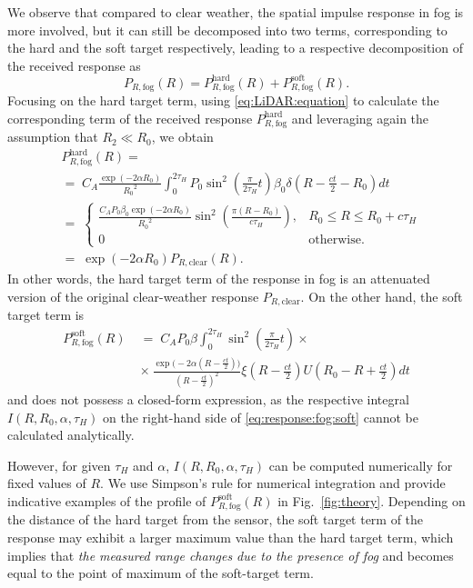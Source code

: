 \documentclass[10pt,twocolumn,letterpaper]{article}
\begin{document}
We observe that compared to clear weather, the spatial impulse response in fog is more involved, but it can still be decomposed into two terms, corresponding to the hard and the soft target respectively, leading to a respective decomposition of the received response as
\begin{equation} \label{eq:response:fog:decomposition}
    P_{R,\text{fog}}(R) = P_{R,\text{fog}}^{\text{hard}}(R) + P_{R,\text{fog}}^{\text{soft}}(R).
\end{equation}
Focusing on the hard target term, using \eqref{eq:LiDAR:equation} to calculate the corresponding term of the received response $P_{R,\text{fog}}^{\text{hard}}$ and leveraging again the assumption that $R_2 \ll R_0$, we obtain 
{\scriptsize
\begin{align}
    &{P^{\text{hard}}_{R,\text{fog}}}(R) = \nonumber \\
    &{=}\;C_A \frac{\exp(-2\alpha{}R_0)}{{R_0}^2} \displaystyle\int_0^{2\tau_H} P_0 \sin^2\left(\frac{\pi}{2\tau_H}t\right)\beta_0\delta(R-\frac{ct}{2}-R_0) dt \nonumber \\
    &{=}\;\left\{\begin{array}{rl}
        \frac{C_A P_0 \beta_0 \exp(-2\alpha{}R_0)}{{R_0}^2} \sin^2\left(\frac{\pi(R-R_0)}{c\tau_H}\right), & R_0 \leq R \leq R_0+c\tau_H \\
        0 & \text{otherwise}.
    \end{array}\right. \nonumber \\
    &{=}\;\exp(-2\alpha{}R_0)P_{R,\text{clear}}(R). \label{eq:response:fog:hard}
\end{align}
}In other words, the hard target term of the response in fog is an attenuated version of the original clear-weather response $P_{R,\text{clear}}$. On the other hand, the soft target term is 
{\scriptsize
\begin{align}
    {P^{\text{soft}}_{R,\text{fog}}}(R)\;&{=}\;{C_A} P_0 \beta \displaystyle\int_0^{2\tau_H} \sin^2\left(\frac{\pi}{2\tau_H}t\right) \times \nonumber \\ &{\times}\:\frac{\exp\Big(-2\alpha{}\left(R-\frac{ct}{2}\right)\Big)}{{\left(R-\frac{ct}{2}\right)}^2} \xi(R-\frac{ct}{2}) U(R_0-R+\frac{ct}{2}) dt \label{eq:response:fog:soft}
\end{align}
}and does not possess a closed-form expression, as the respective integral $I(R,R_0,\alpha,\tau_H)$ on the right-hand side of \eqref{eq:response:fog:soft} cannot be calculated analytically. 

However, for given $\tau_H$ and $\alpha$, $I(R,R_0,\alpha,\tau_H)$ can be computed numerically for fixed values of $R$. We use Simpson's  rule for numerical integration and provide indicative examples of the profile of $P^{\text{soft}}_{R,\text{fog}}(R)$ in Fig.~\ref{fig:theory}. Depending on the distance of the hard target from the sensor, the soft target term of the response may exhibit a larger maximum value than the hard target term, which implies that \emph{the measured range changes due to the presence of fog} and becomes equal to the point of maximum of the soft-target term.
\end{document}
